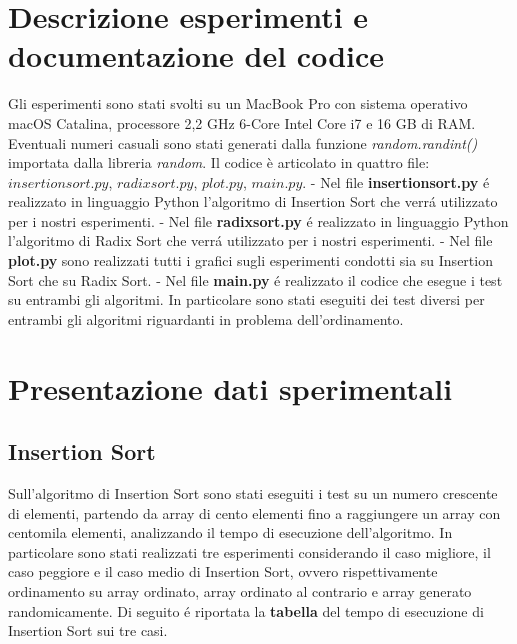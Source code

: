 \documentclass[a4paper]{article}
\begin{document}
\section{Descrizione esperimenti e documentazione del codice}
Gli esperimenti sono stati svolti su un MacBook Pro con sistema operativo macOS Catalina, processore 2,2 GHz 6-Core Intel Core i7 e 16 GB di RAM.
\newline
\newline
Eventuali numeri casuali sono stati generati dalla funzione \textit{random.randint()} importata dalla libreria \textit{random}.
\newline
\newline
Il codice è articolato in quattro file: $insertionsort.py$, $radixsort.py$, $plot.py$, $main.py$.
\newline
\newline
- Nel file \textbf{insertionsort.py} \'e realizzato in linguaggio Python l'algoritmo di Insertion Sort che verr\'a utilizzato per i nostri esperimenti.
\newline
\newline
- Nel file \textbf{radixsort.py} \'e realizzato in linguaggio Python l'algoritmo di Radix Sort che verr\'a utilizzato per i nostri esperimenti.
\newline
\newline
- Nel file \textbf{plot.py} sono realizzati tutti i grafici sugli esperimenti condotti sia su Insertion Sort che su Radix Sort.
\newline
\newline
- Nel  file \textbf{main.py} \'e realizzato il codice che esegue i test su entrambi gli algoritmi. In particolare sono stati eseguiti dei test diversi per entrambi gli algoritmi riguardanti in problema dell'ordinamento. 
\newline
\clearpage
\section{Presentazione dati sperimentali}

\subsection{Insertion Sort}

Sull'algoritmo di Insertion Sort sono stati eseguiti i test su un numero crescente di elementi, partendo da array di cento elementi fino a raggiungere un array con centomila elementi, analizzando il tempo di esecuzione dell'algoritmo. 
\newline
In particolare sono stati realizzati tre esperimenti considerando il caso migliore, il caso peggiore e il caso medio di Insertion Sort, ovvero rispettivamente ordinamento su array ordinato, array ordinato al contrario e array generato randomicamente.
\newline
\newline
Di seguito \'e riportata la \textbf{tabella} del tempo di esecuzione di Insertion Sort sui tre casi.
\end{document}

